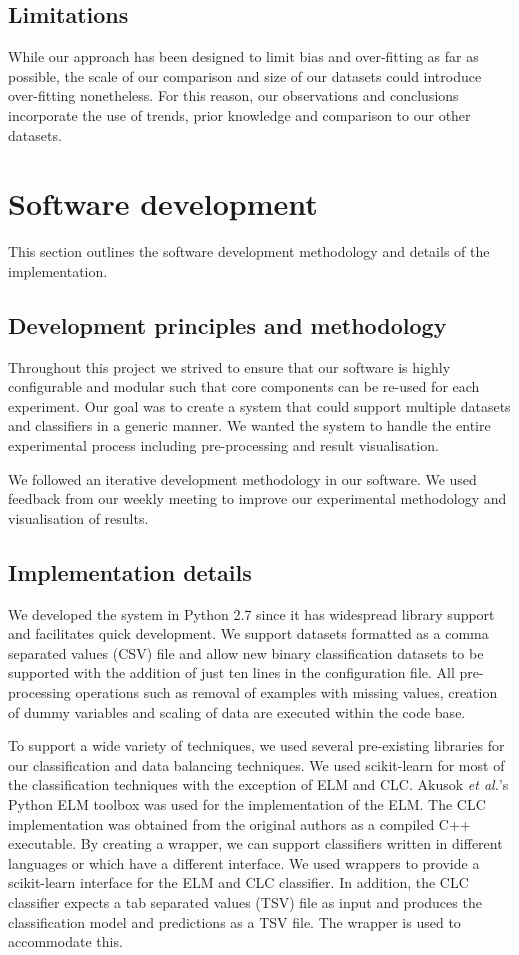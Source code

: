 \documentclass{sig-alternate-05-2015}
\begin{document}
	\subsection{Limitations}
	While our approach has been designed to limit bias and over-fitting as far as possible, the scale of our comparison and size of our datasets could introduce over-fitting nonetheless. For this reason, our observations and conclusions incorporate the use of trends, prior knowledge and comparison to our other datasets. 
	
	\section{Software development}
	This section outlines the software development methodology and details of the implementation.
	\subsection{Development principles and methodology}
	Throughout this project we strived to ensure that our software is highly configurable and modular such that core components can be re-used for each experiment. Our goal was to create a system that could support multiple datasets and classifiers in a generic manner. We wanted the system to handle the entire experimental process including pre-processing and result visualisation.
	
	We followed an iterative development methodology in our software. We used feedback from our weekly meeting to improve our experimental methodology and visualisation of results.
	
	\subsection{Implementation details}
	We developed the system in Python 2.7 since it has widespread library support and facilitates quick development. We support datasets formatted as a comma separated values (CSV) file and allow new binary classification datasets to be supported with the addition of just ten lines in the configuration file. All pre-processing operations such as removal of examples with missing values, creation of dummy variables and scaling of data are executed within the code base.
	
	To support a wide variety of techniques, we used several pre-existing libraries for our classification and data balancing techniques. We used scikit-learn \cite{scikit-learn} for most of the classification techniques with the exception of ELM and CLC. Akusok \textit{et al.}'s \cite{7140733} Python ELM toolbox was used for the implementation of the ELM. The CLC implementation was obtained from the original authors \cite{Chen2006} as a compiled C++ executable. By creating a wrapper, we can support classifiers written in different languages or which have a different interface. We used wrappers to provide a scikit-learn interface for the ELM and CLC classifier. In addition, the CLC classifier expects a tab separated values (TSV) file as input and produces the classification model and predictions as a TSV file. The wrapper is used to accommodate this.
	
\end{document}
